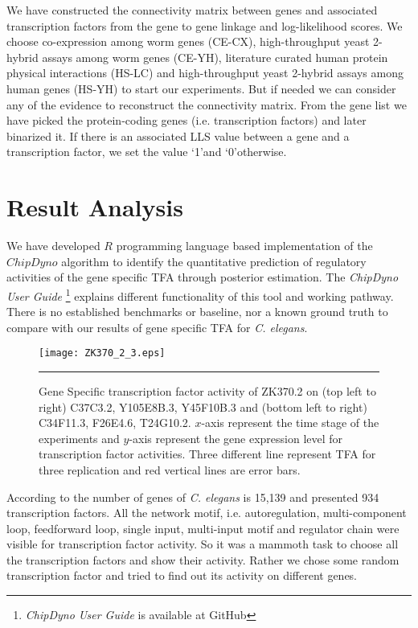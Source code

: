 We have constructed the connectivity matrix between genes and associated transcription factors from the gene to gene linkage and log-likelihood scores. We choose co-expression among worm genes (CE-CX), high-throughput yeast 2-hybrid assays among worm genes (CE-YH), literature curated human protein physical interactions (HS-LC) and high-throughput yeast 2-hybrid assays among human genes (HS-YH) to start our experiments. But if needed we can consider any of the evidence to reconstruct the connectivity matrix. From the gene list we have picked the protein-coding genes (i.e. transcription factors) and later binarized it. If there is an associated LLS value between a gene and a transcription factor, we set the value \lq 1\rq and \lq 0\rq otherwise.

\section{Result Analysis}
We have developed $R$ programming language based implementation of the $ChipDyno$ algorithm to identify the quantitative prediction of regulatory activities of the gene specific TFA through posterior estimation. The \textit{ChipDyno User Guide} \footnote{\textit{ChipDyno User Guide} is available at GitHub} explains different functionality of this tool and working pathway. There is no established benchmarks or baseline, nor a known ground truth to compare with our results of gene specific TFA for \textit{C. elegans}.

\begin{figure}
	\centering
		\texttt{[image: ZK370\_2\_3.eps]}
		\rule{35em}{0.5pt}
	\caption[Gene Specific transcription factor activity of ZK370.2]
		{Gene Specific transcription factor activity of ZK370.2 on (top left to right) C37C3.2, Y105E8B.3, Y45F10B.3 and (bottom left to right) C34F11.3, F26E4.6, T24G10.2. $x$-axis represent the time stage of the experiments and $y$-axis represent the gene expression level for transcription factor activities. Three different line represent TFA for three replication and red vertical lines are error bars.}
	\label{fig:TFA_of_of_ZK370.2}
\end{figure}

According to \cite{WormNet} the number of genes of \textit{C. elegans} is 15,139 and \cite{Inmaculada:2007} presented 934 transcription factors. All the network motif, i.e. autoregulation, multi-component loop, feedforward loop, single input, multi-input motif and regulator chain were visible for transcription factor activity. So it was a mammoth task to choose all the transcription factors and show their activity. Rather we chose some random transcription factor and tried to find out its activity on different genes.

